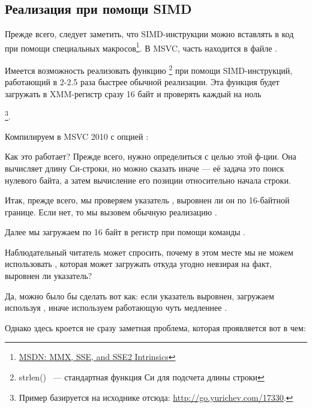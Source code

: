 ﻿\subsection{Реализация \strlen при помощи SIMD}
\label{SIMD_strlen}

\newcommand{\URLMSDNSSE}{\href{http://go.yurichev.com/17262}{MSDN: MMX, SSE, and SSE2 Intrinsics}}

Прежде всего, следует заметить, что SIMD-инструкции можно вставлять в \CCpp код при помощи специальных 
макросов\footnote{\URLMSDNSSE}. В MSVC, часть находится в файле .

\newcommand{\URLSTRLEN}{http://go.yurichev.com/17330}

Имеется возможность реализовать функцию \strlen\footnote{strlen() ~--- стандартная функция Си 
для подсчета длины строки} при помощи SIMD-инструкций, работающий в 2-2.5 раза быстрее обычной реализации. 
Эта функция будет загружать в XMM-регистр сразу 16 байт и проверять каждый на ноль

\footnote{Пример базируется на исходнике отсюда: \url{\URLSTRLEN}.}.



Компилируем в MSVC 2010 с опцией \Ox:



Как это работает?
Прежде всего, нужно определиться с целью этой ф-ции.
Она вычисляет длину Си-строки, но можно сказать иначе --- её задача это поиск нулевого байта, а затем вычисление его позиции относительно начала строки.

Итак, прежде всего, мы проверяем указатель , выровнен ли он по 16-байтной границе. 
Если нет, то мы вызовем обычную реализацию \strlen.

Далее мы загружаем по 16 байт в регистр  при помощи команды \MOVDQA.

Наблюдательный читатель может спросить, почему в этом месте мы не можем использовать \MOVDQU, 
которая может загружать откуда угодно невзирая на факт, выровнен ли указатель?

Да, можно было бы сделать вот как: если указатель выровнен, загружаем используя \MOVDQA, 
иначе используем работающую чуть медленнее \MOVDQU.

Однако здесь кроется не сразу заметная проблема, которая проявляется вот в чем:

